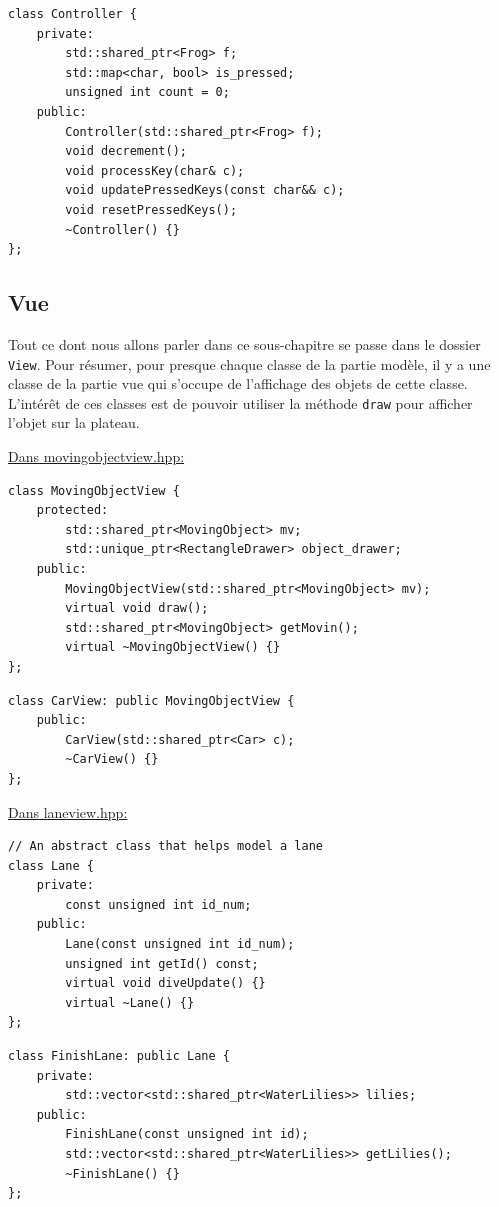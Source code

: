 \documentclass[a4paper, 12pt]{article}
\begin{document}
\begin{lstlisting}
class Controller {
    private:
        std::shared_ptr<Frog> f;
        std::map<char, bool> is_pressed;
        unsigned int count = 0;
    public:
        Controller(std::shared_ptr<Frog> f);
        void decrement();
        void processKey(char& c);
        void updatePressedKeys(const char&& c);
        void resetPressedKeys();
        ~Controller() {}
};
\end{lstlisting}

\subsection{Vue}

Tout ce dont nous allons parler dans ce sous-chapitre se passe dans le dossier \texttt{View}. 
Pour résumer, pour presque chaque classe de la partie modèle, 
il y a une classe de la partie vue qui s'occupe de l'affichage des objets de cette classe.
L'intérêt de ces classes est de pouvoir utiliser la méthode \texttt{draw} pour afficher 
l'objet sur la plateau. 

\underline{Dans movingobjectview.hpp:} \hspace{0.5cm}

\begin{lstlisting}
class MovingObjectView {
    protected:
        std::shared_ptr<MovingObject> mv;
        std::unique_ptr<RectangleDrawer> object_drawer;
    public:
        MovingObjectView(std::shared_ptr<MovingObject> mv);
        virtual void draw();
        std::shared_ptr<MovingObject> getMovin();
        virtual ~MovingObjectView() {}
};
\end{lstlisting}

\begin{lstlisting}
class CarView: public MovingObjectView {
    public:
        CarView(std::shared_ptr<Car> c);
        ~CarView() {}
};
\end{lstlisting}

\underline{Dans laneview.hpp:} \hspace{0.5cm}

\begin{lstlisting}
// An abstract class that helps model a lane
class Lane {
    private:
        const unsigned int id_num;
    public:
        Lane(const unsigned int id_num);
        unsigned int getId() const;
        virtual void diveUpdate() {}
        virtual ~Lane() {}
};
\end{lstlisting}

\begin{lstlisting}
class FinishLane: public Lane {
    private:
        std::vector<std::shared_ptr<WaterLilies>> lilies;
    public:
        FinishLane(const unsigned int id);
        std::vector<std::shared_ptr<WaterLilies>> getLilies();
        ~FinishLane() {}
};
\end{lstlisting}
\end{document}
